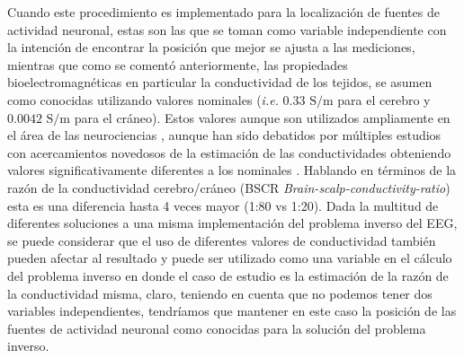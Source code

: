 Cuando este procedimiento es implementado para la localización de fuentes de actividad neuronal, estas son las que se toman como variable independiente con la intención de encontrar la posición que mejor se ajusta a las mediciones, mientras que como se comentó anteriormente, las propiedades bioelectromagnéticas en particular la conductividad de los tejidos, se asumen como conocidas utilizando valores nominales (\emph{i.e.} $0.33\text{ S/m}$ para el cerebro y $0.0042 \text{ S/m}$ para el cráneo). 
Estos valores aunque son utilizados ampliamente en el área de las neurociencias \cite{Rush1968,Rush1969,Cohen1983}, aunque han sido debatidos por múltiples estudios con acercamientos novedosos de la estimación de las conductividades obteniendo valores significativamente diferentes a los nominales \cite{McCann2019}. 
Hablando en términos de la razón de la conductividad cerebro/cráneo (BSCR \emph{Brain-scalp-conductivity-ratio}) esta es una diferencia hasta 4 veces mayor (1:80 vs 1:20). 
Dada la multitud de diferentes soluciones a una misma implementación del problema inverso del EEG, se puede considerar que el uso de diferentes valores de conductividad también pueden afectar al resultado y puede ser utilizado como una variable en el cálculo del problema inverso en donde el caso de estudio es la estimación de la razón de la conductividad misma, claro, teniendo en cuenta que no podemos tener dos variables independientes, tendríamos que mantener en este caso la posición de las fuentes de actividad neuronal como conocidas para la solución del problema inverso.








